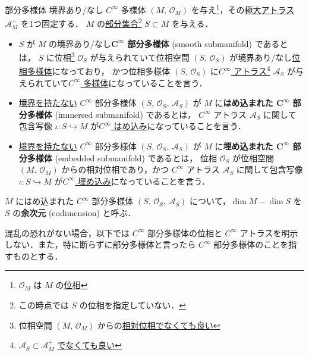 \documentclass[geometry_main]{subfiles}
\begin{document}
\begin{mydef}[label=def:submanifold,breakable]{部分多様体}
	境界あり/なし $C^\infty$ 多様体 $(M,\, \mathscr{O}_M)$ を与え\footnote{$\mathscr{O}_M$ は $M$ の\hyperref[ax.topo]{位相}}，その\hyperref[maxatlas]{極大アトラス} $\mathcal{A}_M^+$ を1つ固定する．
	$M$ の\underline{部分集合}\footnote{この時点では $S$ の位相を指定していない．} $S \subset M$ を与える．
	\begin{itemize}
		\item $S$ が $M$ の境界あり/なし\textbf{$\bm{C^\infty}$ 部分多様体} (smooth submanifold) であるとは，
		$S$ に位相\footnote{位相空間 $(M,\, \mathscr{O}_M)$ からの\hyperref[def.reltopo]{相対位相}\underline{でなくても良い}} $\mathscr{O}_S$ が与えられていて位相空間 $(S,\, \mathscr{O}_S)$ が境界あり/なし\hyperref[def.topomani]{位相多様体}になっており，
		かつ位相多様体 $(S,\, \mathscr{O}_S)$ に\hyperref[diffmani]{$C^\infty$ アトラス}\footnote{$\mathcal{A}_S \subset \mathcal{A}_M^+$ \underline{でなくても良い}} $\mathcal{A}_S$ が与えられていて\hyperref[diffmani]{$C^\infty$ 多様体}になっていることを言う．
		\item \underline{境界を持たない} $C^\infty$ 部分多様体 $(S,\, \mathscr{O}_S,\, \mathcal{A}_S)$ が $M$ に\textbf{はめ込まれた $\bm{C^\infty}$ 部分多様体} (immersed submanifold) であるとは，
		$C^\infty$ アトラス $\mathcal{A}_S$ に関して包含写像 $\iota \colon S \hookrightarrow M$ が\hyperref[def:submersion-smooth]{$C^\infty$ はめ込み}になっていることを言う．
		\item \underline{境界を持たない} $C^\infty$ 部分多様体 $(S,\, \mathscr{O}_S,\, \mathcal{A}_S)$ が $M$ に\textbf{埋め込まれた $\bm{C^\infty}$ 部分多様体} (embedded submanifold) であるとは，
		位相 $\mathscr{O}_S$ が位相空間 $(M,\, \mathscr{O}_M)$ からの相対位相であり，かつ
		$C^\infty$ アトラス $\mathcal{A}_S$ に関して包含写像 $\iota \colon S \hookrightarrow M$ が\hyperref[def:submersion-smooth]{$C^\infty$ 埋め込み}になっていることを言う．
	\end{itemize}
	
	\tcblower

	$M$ にはめ込まれた $C^\infty$ 部分多様体 $(S,\, \mathscr{O}_S,\, \mathcal{A}_S)$ について，$\dim M - \dim S$ を $S$ の\textbf{余次元} (codimension) と呼ぶ．
\end{mydef}

混乱の恐れがない場合，以下では $C^\infty$ 部分多様体の位相と $C^\infty$ アトラスを明示しない．また，特に断らずに部分多様体と言ったら $C^\infty$ 部分多様体のことを指すものとする．
\end{document}
